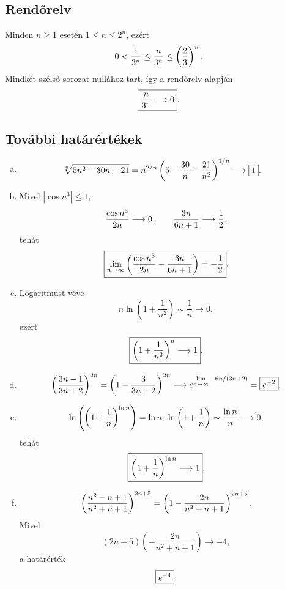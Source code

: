 \documentclass{szb-solution}
\begin{document}
\subsection{Rendőrelv}

Minden $n\geq1$ esetén $1\leq n\leq2^n$, ezért
$$
  0<\frac{1}{3^n}\leq\frac{n}{3^n}\leq\left(\frac23\right)^n
  \text.
$$
Mindkét szélső sorozat nullához tart, így a rendőrelv alapján
$$
  \boxed{\frac{n}{3^n}\longrightarrow0}
  \text.
$$

\subsection{További határértékek}

\begin{enumerate}[a)]
  \item
        \begin{align*}
          \sqrt[n]{5n^2-30n-21}
          &=n^{2/n}\left(5-\frac{30}{n}-\frac{21}{n^2}\right)^{1/n}
          \longrightarrow\boxed{1}
          \text.
        \end{align*}

  \item Mivel $|\cos n^3|\leq1$,
        $$
          \frac{\cos n^3}{2n}\longrightarrow0,
          \qquad
          \frac{3n}{6n+1}\longrightarrow\frac12
          \text,
        $$
        tehát
        $$
          \boxed{
            \lim_{n\to\infty}\left(
              \frac{\cos n^3}{2n}-\frac{3n}{6n+1}
            \right)=-\frac12
          }
          \text.
        $$

  \item Logaritmust véve
        $$
          n\ln\left(1+\frac{1}{n^2}\right)
          \sim\frac1n\longrightarrow0,
        $$
        ezért
        $$
          \boxed{\left(1+\frac{1}{n^2}\right)^n\longrightarrow1}
          \text.
        $$

  \item
        $$
          \left(\frac{3n-1}{3n+2}\right)^{2n}
          =\left(1-\frac{3}{3n+2}\right)^{2n}
          \longrightarrow
          e^{\lim\limits_{n\to\infty}-6n/(3n+2)}
          =\boxed{e^{-2}}
          \text.
        $$

  \item
        $$
          \ln\left(\left(1+\frac1n\right)^{\ln n}\right)
          =\ln n\cdot\ln\left(1+\frac1n\right)
          \sim\frac{\ln n}{n}\longrightarrow0
          \text,
        $$
        tehát
        $$
          \boxed{\left(1+\frac1n\right)^{\ln n}\longrightarrow1}
          \text.
        $$

  \item
        $$
          \left(\frac{n^2-n+1}{n^2+n+1}\right)^{2n+5}
          =\left(1-\frac{2n}{n^2+n+1}\right)^{2n+5}
          \text.
        $$
        Mivel
        $$
          (2n+5)\left(-\frac{2n}{n^2+n+1}\right)\longrightarrow-4,
        $$
        a határérték
        $$
          \boxed{e^{-4}}
          \text.
        $$
\end{enumerate}
\end{document}
